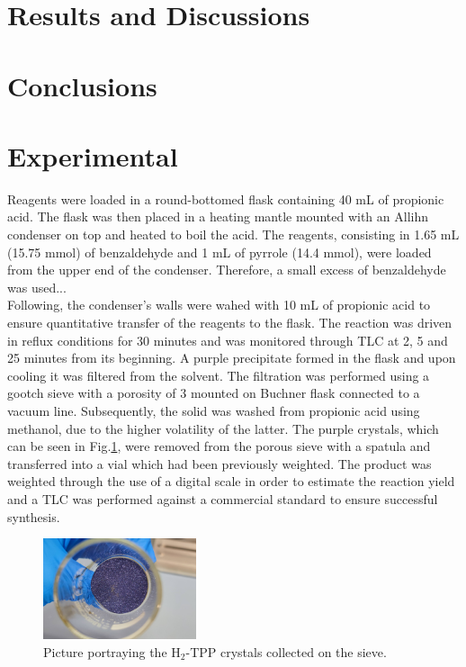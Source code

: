 \documentclass[num-refs]{wiley-article}
\begin{document}
\section{Results and Discussions}

\section{Conclusions}
\section{Experimental}
Reagents were loaded in a round-bottomed flask containing 40 mL of propionic acid.
The flask was then placed in a heating mantle mounted with an Allihn condenser on top and heated to boil the acid.
The reagents, consisting in 1.65 mL (15.75 mmol) of benzaldehyde and 1 mL of pyrrole (14.4 mmol), were loaded from the upper end of the condenser.
Therefore, a small excess of benzaldehyde was used... \\
Following, the condenser's walls were wahed with 10 mL of propionic acid to ensure quantitative transfer of the reagents to the flask.
The reaction was driven in reflux conditions for 30 minutes and was monitored through TLC at 2, 5 and 25 minutes from its beginning.
A purple precipitate formed in the flask and upon cooling it was filtered from the solvent.
The filtration was performed using a gootch sieve with a porosity of 3 mounted on Buchner flask connected to a vacuum line.
Subsequently, the solid was washed from propionic acid using methanol, due to the higher volatility of the latter.
The purple crystals, which can be seen in Fig.\ref{pic-tpp}, were removed from the porous sieve with a spatula and transferred into a vial which had been previously weighted.
The product was weighted through the use of a digital scale in order to estimate the reaction yield and a TLC was performed against a commercial standard to ensure successful synthesis.\\
\begin{figure}[h]
    \centering
    \includegraphics[width=0.4\textwidth]{photo-tpp}
    \caption{Picture portraying the H$_{2}$-TPP crystals collected on the sieve.}
    \label{pic-tpp}
\end{figure}
\end{document}
